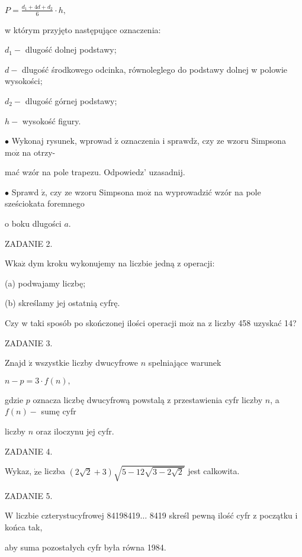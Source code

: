 \documentclass[a4paper,12pt]{article}
\begin{document}
$P=\displaystyle \frac{d_{1}+4d+d_{2}}{6}\cdot h,$

w którym przyjęto następujące oznaczenia:

$d_{1}-$ dlugość dolnej podstawy;

$d-$ dlugość środkowego odcinka, równoleglego do podstawy dolnej w polowie wysokości;

$d_{2}-$ dlugość górnej podstawy;

$h-$ wysokość figury.

$\bullet$ Wykonaj rysunek, wprowad $\acute{\mathrm{z}}$ oznaczenia i $\mathrm{s}\mathrm{p}\mathrm{r}\mathrm{a}\mathrm{w}\mathrm{d}\acute{\mathrm{z}}$, czy ze wzoru Simpsona $\mathrm{m}\mathrm{o}\dot{\mathrm{z}}$ na otrzy-

mać wzór na pole trapezu. Odpowiedz' uzasadnij.

$\bullet$ Sprawd $\acute{\mathrm{z}}$, czy ze wzoru Simpsona $\mathrm{m}\mathrm{o}\dot{\mathrm{z}}$ na wyprowadzić wzór na pole sześciokata foremnego

o boku dlugości $a.$

ZADANIE 2.

$\mathrm{W}\mathrm{k}\mathrm{a}\dot{\mathrm{z}}$ dym kroku wykonujemy na liczbie jedną z operacji:

(a) podwajamy liczbę;

(b) skreślamy jej ostatnią cyfrę.

Czy w taki sposób po skończonej ilości operacji $\mathrm{m}\mathrm{o}\dot{\mathrm{z}}$ na z liczby 458 uzyskać 14?

ZADANIE 3.

Znajd $\acute{\mathrm{z}}$ wszystkie liczby dwucyfrowe $n$ spelniające warunek

$n-p=3\cdot f(n),$

gdzie $p$ oznacza liczbę dwucyfrową powstalą z przestawienia cyfr liczby $n$, a $f(n)-$ sumę cyfr

liczby $n$ oraz iloczynu jej cyfr.

ZADANIE 4.

Wykaz, $\dot{\mathrm{z}}\mathrm{e}$ liczba $(2\sqrt{2}+3)\sqrt{5-12\sqrt{3-2\sqrt{2}}}$ jest calkowita.

ZADANIE 5.

$\mathrm{W}$ liczbie czterystucyfrowej 84198419$\ldots$ 8419 skreśl pewną ilość cyfr z początku i końca tak,

aby suma pozostałych cyfr była równa 1984.
\end{document}
